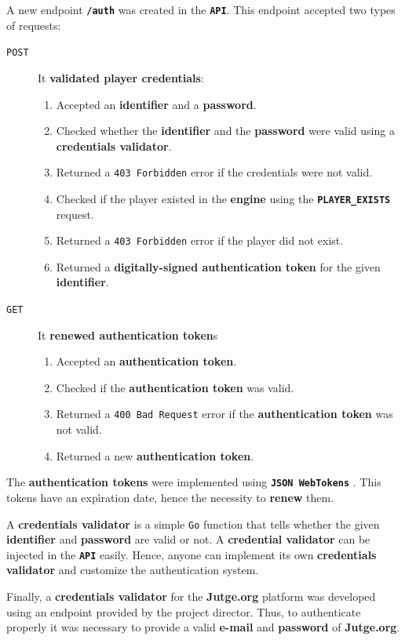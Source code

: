 \documentclass[a4paper,11pt,titlepage,abstract,numbers=noenddot,automark,mnsy,intlimits,rgb,dvipsnames]{report}
\begin{document}
A new endpoint \textbf{\texttt{/auth}} was created in the \textbf{\texttt{API}}. This endpoint accepted two types of requests:
\begin{description}
\item[\texttt{POST}]
It \textbf{validated player credentials}:
\begin{enumerate}
\item
Accepted an \textbf{identifier} and a \textbf{password}.
\item
Checked whether the \textbf{identifier} and the \textbf{password} were valid using a \textbf{credentials validator}.
\item
Returned a \texttt{403 Forbidden} error if the credentials were not valid.
\item
Checked if the player existed in the \textbf{engine} using the \textbf{\texttt{PLAYER\_EXISTS}} request.
\item
Returned a \texttt{403 Forbidden} error if the player did not exist.
\item
Returned a \textbf{digitally-signed authentication token} for the given \textbf{identifier}.
\end{enumerate}
\item[\texttt{GET}]
It \textbf{renewed authentication token}s
\begin{enumerate}
\item
Accepted an \textbf{authentication token}.
\item
Checked if the \textbf{authentication token} was valid.
\item
Returned a \texttt{400 Bad Request} error if the \textbf{authentication token} was not valid.
\item
Returned a new \textbf{authentication token}.
\end{enumerate}
\end{description}
The \textbf{authentication tokens} were implemented using \textbf{\texttt{JSON WebTokens}} \cite{jwt}. This tokens have an expìration date,
hence the necessity to \textbf{renew} them.

A \textbf{credentials validator} is a simple \texttt{Go} function that tells whether the given \textbf{identifier} and
\textbf{password} are valid or not. A \textbf{credential validator} can be injected in the \textbf{\texttt{API}} easily. Hence, anyone can
implement its own \textbf{credentials validator} and customize the authentication system.

Finally, a \textbf{credentials validator} for the \textbf{Jutge.org} platform was developed using an endpoint provided by the project
director. Thus, to authenticate properly it was necessary to provide a valid \textbf{e-mail} and \textbf{password} of \textbf{Jutge.org}.
\end{document}
